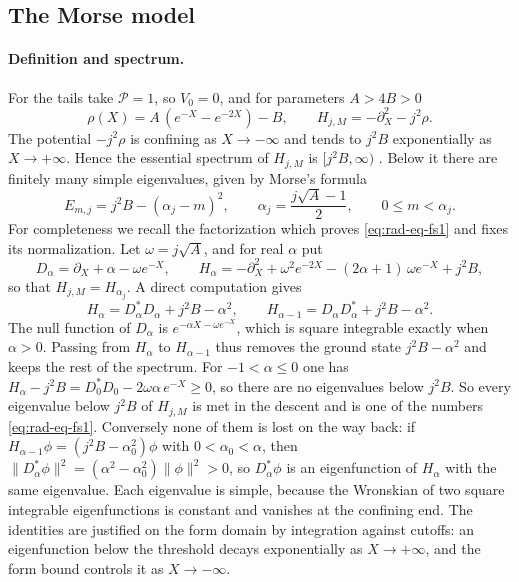 \subsection{The Morse model}
\label{subsec:morse}

\paragraph{Definition and spectrum.}
For the tails take $\mathcal P=1$, so $V_0=0$, and for parameters
$A>4B>0$
\[
 \rho(X)=A\,(e^{-X}-e^{-2X})-B,
 \qquad H_{j,M}=-\partial_X^2-j^2\rho .
\]
The potential $-j^2\rho$ is confining as $X\to-\infty$ and tends to
$j^2B$ exponentially as $X\to+\infty$. Hence the essential spectrum of
$H_{j,M}$ is $[j^2B,\infty)$ \cite[Theorem~6.19]{Teschl2009}. Below it
there are finitely many simple eigenvalues, given by Morse's formula
\cite{Morse1929}
\begin{equation}\label{eq:rad-eq-fs1}
 E_{m,j}=j^2B-(\alpha_j-m)^2,
 \qquad \alpha_j=\frac{j\sqrt A-1}2,\qquad 0\le m<\alpha_j .
\end{equation}
For completeness we recall the factorization which proves
\eqref{eq:rad-eq-fs1} and fixes its normalization. Let
$\omega=j\sqrt A$, and for real $\alpha$ put
\[
 D_\alpha=\partial_X+\alpha-\omega e^{-X},\qquad
 H_\alpha=-\partial_X^2+\omega^2e^{-2X}-(2\alpha+1)\,\omega e^{-X}+j^2B,
\]
so that $H_{j,M}=H_{\alpha_j}$. A direct computation gives
\[
 H_\alpha=D_\alpha^*D_\alpha+j^2B-\alpha^2,
 \qquad
 H_{\alpha-1}=D_\alpha D_\alpha^*+j^2B-\alpha^2 .
\]
The null function of $D_\alpha$ is $e^{-\alpha X-\omega e^{-X}}$,
which is square integrable exactly when $\alpha>0$. Passing from
$H_\alpha$ to $H_{\alpha-1}$ thus removes the ground state
$j^2B-\alpha^2$ and keeps the rest of the spectrum. For
$-1<\alpha\le0$ one has
$H_\alpha-j^2B=D_0^*D_0-2\omega\alpha\,e^{-X}\ge0$, so there are no
eigenvalues below $j^2B$. So every eigenvalue below $j^2B$ of
$H_{j,M}$ is met in the descent and is one of the numbers
\eqref{eq:rad-eq-fs1}. Conversely none of them is lost on the way
back: if $H_{\alpha-1}\phi=(j^2B-\alpha_0^2)\phi$ with
$0<\alpha_0<\alpha$, then
$\|D_\alpha^*\phi\|^2=(\alpha^2-\alpha_0^2)\|\phi\|^2>0$, so
$D_\alpha^*\phi$ is an eigenfunction of $H_\alpha$ with the same
eigenvalue. Each eigenvalue is simple, because the Wronskian of two
square integrable eigenfunctions is constant and vanishes at the
confining end. The identities are justified on the form domain by
integration against cutoffs: an eigenfunction below the threshold
decays exponentially as $X\to+\infty$, and the form bound controls it
as $X\to-\infty$.

